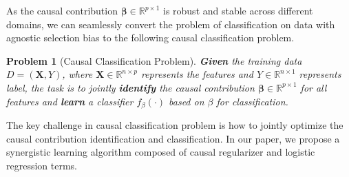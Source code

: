 \documentclass[sigconf]{acmart}
\newtheorem{problem}{Problem}
\begin{document}
As the causal contribution $\bm{\beta} \in \mathbb{R}^{p\times 1}$ is robust and stable across different domains, we can seamlessly convert the problem of classification on data with agnostic selection bias to the following causal classification problem.

\begin{problem}[Causal Classification Problem]
\textbf{Given} the training data $D=(\bm{X},Y)$, where $\bm{X} \in \mathbb{R}^{n\times p}$ represents the features and $Y \in \mathbb{R}^{n\times 1}$ represents label, the task is to jointly \textbf{identify} the causal contribution $\bm{\beta} \in \mathbb{R}^{p\times 1}$ for all features and \textbf{learn} a classifier $f_{\beta}(\cdot)$ based on $\beta$ for classification.
\end{problem}

The key challenge in causal classification problem is how to jointly optimize the causal contribution identification and classification.
In our paper, we propose a synergistic learning algorithm composed of causal regularizer and logistic regression terms. 
\end{document}
